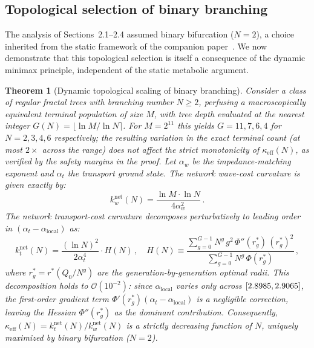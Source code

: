 \documentclass[11pt,a4paper]{article}
\newtheorem{theorem}{Theorem}
\theoremstyle{remark}
\begin{document}
\subsection{Topological selection of binary branching}
\label{sec:topo}

The analysis of Sections~2.1--2.4 assumed binary bifurcation ($N = 2$), a choice
inherited from the static framework of the companion
paper~\cite{Marchesi2026static}. We now demonstrate that this topological
selection is itself a consequence of the dynamic minimax principle, independent
of the static metabolic argument.

\begin{theorem}[Dynamic topological scaling of binary branching]
\label{thm:topoN}
Consider a class of regular fractal trees with branching number $N \ge 2$,
perfusing a macroscopically equivalent terminal population of size $M$, with
tree depth evaluated at the nearest integer $G(N) = \lfloor \ln M / \ln N
\rceil$. For $M = 2^{11}$ this yields $G = 11, 7, 6, 4$ for $N = 2, 3, 4, 6$
respectively; the resulting variation in the exact terminal count (at most
$2\times$ across the range) does not affect the strict monotonicity of
$\kappa_{\mathrm{eff}}(N)$, as verified by the safety margins in the proof. Let
$\alpha_w$ be the impedance-matching exponent and $\alpha_t$ the transport
ground state. The network wave-cost curvature is given exactly by:
\begin{equation} k_w^\mathrm{net}(N) = \frac{\ln M \cdot \ln N}{4\alpha_w^2}\,. \label{eq:kw_N} \end{equation}
The network transport-cost curvature decomposes perturbatively to leading order
in $(\alpha_t - \alpha_\mathrm{local})$ as:
\begin{equation} k_t^\mathrm{net}(N) = \frac{(\ln N)^2}{2\alpha_t^4} \cdot H(N)\,, \quad H(N) \equiv \frac{\displaystyle\sum_{g=0}^{G-1} N^g\, g^2\, \Phi''(r_g^*)\, (r_g^*)^2} {\displaystyle\sum_{g=0}^{G-1} N^g\, \Phi(r_g^*)}\,, \label{eq:kt_N} \end{equation}
where $r_g^* = r^*(Q_0/N^g)$ are the generation-by-generation optimal radii.
This decomposition holds to $\mathcal{O}(10^{-2})$: since
$\alpha_\mathrm{local}$ varies only across $[2.8985,
2.9065]$, the first-order gradient term $\Phi'(r_g^*)(\alpha_t -
\alpha_\mathrm{local})$ is a negligible correction, leaving the Hessian
$\Phi''(r_g^*)$ as the dominant contribution.
Consequently, $\kappa_\mathrm{eff}(N) = k_t^\mathrm{net}(N)/k_w^\mathrm{net}(N)$
is a strictly decreasing function of $N$, uniquely maximized by binary
bifurcation ($N = 2$).
\end{theorem}
\end{document}
